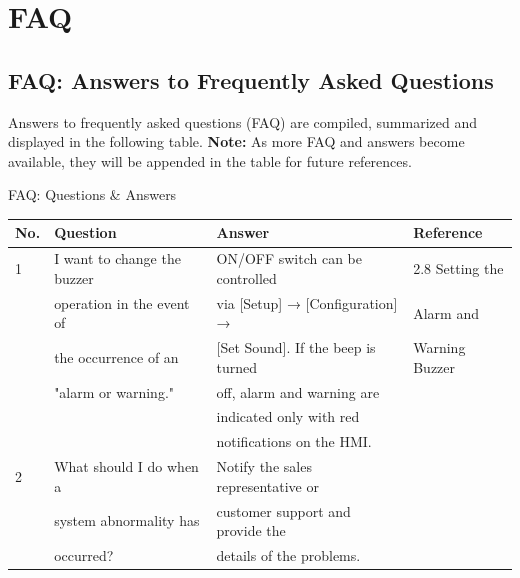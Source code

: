 %
\chapter{FAQ}
\label{appdxa-faq} 

\section{FAQ: Answers to Frequently Asked Questions} 

Answers to frequently asked questions (FAQ) are compiled, summarized and displayed in the following table. {\bf{Note:}} As more FAQ and answers become available, they will be appended in the table for future references.

\begin{table2}[label={mynamelabel},nameref={Title}]{FAQ: Questions \& Answers} {\label{tab:faq-001}}
{%
\begin{tabular}{l | l| l | l}
\hline 
{\bf{No.}} & {\bf{Question}} & {\bf{Answer}} & {\bf{Reference}} \\
\hline \hline 
1   & I want to change the buzzer & ON/OFF switch can be controlled    & 2.8 Setting the  \\ 
    & operation in the event of   & via [Setup] → [Configuration] →    & Alarm and  \\
    & the occurrence of an        & [Set Sound]. If the beep is turned & Warning Buzzer   \\
    & "alarm or warning."         & off, alarm and warning are         &                         \\
    &                             & indicated only with red            &                      \\ 
    &                             & notifications on the HMI.          &    \\ \hline 
2   & What should I do when a     & Notify the sales representative or & \\
    & system abnormality has      & customer support and provide the   &        \\
    & occurred?                   & details of the problems.           & \\ 

\end{tabular} 
}
\end{table2}